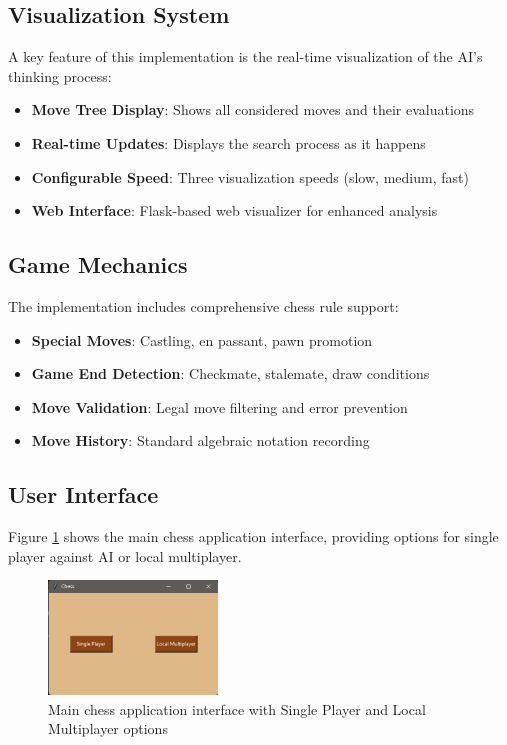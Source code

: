 \documentclass[11pt,a4paper]{report}
\begin{document}
\subsection{Visualization System}
A key feature of this implementation is the real-time visualization of the AI's thinking process:

\begin{itemize}
    \item \textbf{Move Tree Display}: Shows all considered moves and their evaluations
    \item \textbf{Real-time Updates}: Displays the search process as it happens
    \item \textbf{Configurable Speed}: Three visualization speeds (slow, medium, fast)
    \item \textbf{Web Interface}: Flask-based web visualizer for enhanced analysis
\end{itemize}

\subsection{Game Mechanics}
The implementation includes comprehensive chess rule support:

\begin{itemize}
    \item \textbf{Special Moves}: Castling, en passant, pawn promotion
    \item \textbf{Game End Detection}: Checkmate, stalemate, draw conditions
    \item \textbf{Move Validation}: Legal move filtering and error prevention
    \item \textbf{Move History}: Standard algebraic notation recording
\end{itemize}

\subsection{User Interface}
Figure \ref{fig:chess_interface} shows the main chess application interface, providing options for single player against AI or local multiplayer.

\begin{figure}[H]
    \centering
    \includegraphics[width=0.4\textwidth]{images/chess_interface.png}
    \caption{Main chess application interface with Single Player and Local Multiplayer options}
    \label{fig:chess_interface}
\end{figure}
\end{document}
